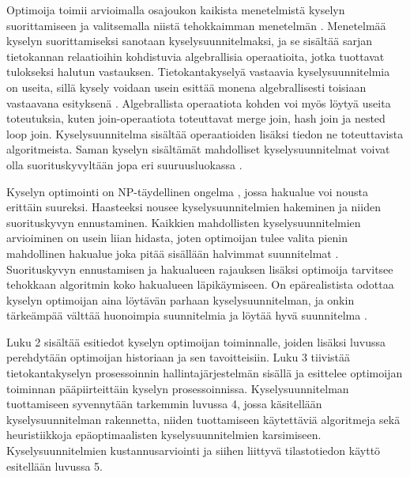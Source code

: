 \documentclass[finnish]{tktltiki2}
\theoremstyle{definition}
\theoremstyle{remark}
\begin{document}
Optimoija toimii arvioimalla osajoukon kaikista menetelmistä kyselyn suorittamiseen ja valitsemalla niistä tehokkaimman menetelmän \cite{selinger1979access}. Menetelmää kyselyn suorittamiseksi sanotaan kyselysuunnitelmaksi, ja se sisältää sarjan tietokannan relaatioihin kohdistuvia algebrallisia operaatioita, jotka tuottavat tulokseksi halutun vastauksen. Tietokantakyselyä vastaavia kyselysuunnitelmia on useita, sillä kysely voidaan usein esittää monena algebrallisesti toisiaan vastaavana esityksenä \cite{jarke1984}. Algebrallista operaatiota kohden voi myös löytyä useita toteutuksia, kuten join-operaatiota toteuttavat merge join, hash join ja nested loop join. Kyselysuunnitelma sisältää operaatioiden lisäksi tiedon ne toteuttavista algoritmeista. Saman kyselyn sisältämät mahdolliset kyselysuunnitelmat voivat olla suorituskyvyltään jopa eri suuruusluokassa \cite{ioannidis1996query, oracle2013refman}. 


Kyselyn optimointi on NP-täydellinen ongelma \cite{ibaraki1984optimal}, jossa hakualue voi nousta erittäin suureksi. Haasteeksi nousee kyselysuunnitelmien hakeminen ja niiden suorituskyvyn ennustaminen. Kaikkien mahdollisten kyselysuunnitelmien arvioiminen on usein liian hidasta, joten optimoijan tulee valita pienin mahdollinen hakualue joka pitää sisällään halvimmat suunnitelmat \cite{chaudhuri1998}. Suorituskyvyn ennustamisen ja hakualueen rajauksen lisäksi optimoija tarvitsee tehokkaan algoritmin koko hakualueen läpikäymiseen. On epärealistista odottaa kyselyn optimoijan aina löytävän parhaan kyselysuunnitelman, ja onkin tärkeämpää välttää huonoimpia suunnitelmia ja löytää hyvä suunnitelma \cite{ramakrishnan2003database}. 

Luku 2 sisältää esitiedot kyselyn optimoijan toiminnalle, joiden lisäksi luvussa perehdytään optimoijan historiaan ja sen tavoitteisiin. Luku 3 tiivistää tietokantakyselyn prosessoinnin hallintajärjestelmän sisällä ja esittelee optimoijan toiminnan pääpiirteittäin kyselyn prosessoinnissa. Kyselysuunnitelman tuottamiseen syvennytään tarkemmin luvussa 4, jossa käsitellään kyselysuunnitelman rakennetta, niiden tuottamiseen käytettäviä algoritmeja sekä heuristiikkoja epäoptimaalisten kyselysuunnitelmien karsimiseen. Kyselysuunnitelmien kustannusarviointi ja siihen liittyvä tilastotiedon käyttö esitellään luvussa 5. 
\end{document}
